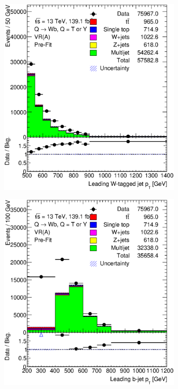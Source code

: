 \begin{figure}[hbt!]
	\centering
	\graphicspath{{figs/chapter5/nocorr/}}
	\begin{subfigure}{.35\textwidth}
		\centering
		\includegraphics[width=\linewidth,height=\textheight,keepaspectratio]{VR_B_ljet_pt.eps}
		\caption{}
		\label{fig:abcd:estimate:ljet_pt}
	\end{subfigure}\hspace{0.6cm}
	\begin{subfigure}{.35\textwidth}
		\centering
		\includegraphics[width=\linewidth,height=\textheight,keepaspectratio]{VR_B_jet_pt.eps}

\end{subfigure}
\end{figure}
